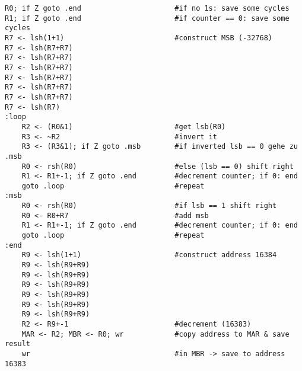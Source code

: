 \documentclass[a4paper, 12pt, margins=2cm]{homework}
\begin{document}
\newpage

  \begin{problem}
  \end{problem}
  \begin{solution} \hfill

    \begin{lstlisting}
R0; if Z goto .end                      #if no 1s: save some cycles
R1; if Z goto .end                      #if counter == 0: save some cycles
R7 <- lsh(1+1)                          #construct MSB (-32768)
R7 <- lsh(R7+R7)
R7 <- lsh(R7+R7)
R7 <- lsh(R7+R7)
R7 <- lsh(R7+R7)
R7 <- lsh(R7+R7)
R7 <- lsh(R7+R7)
R7 <- lsh(R7)
:loop
    R2 <- (R0&1)                        #get lsb(R0)
    R3 <- ~R2                           #invert it
    R3 <- (R3&1); if Z goto .msb        #if inverted lsb == 0 gehe zu .msb
    R0 <- rsh(R0)                       #else (lsb == 0) shift right 
    R1 <- R1+-1; if Z goto .end         #decrement counter; if 0: end
    goto .loop                          #repeat
:msb
    R0 <- rsh(R0)                       #if lsb == 1 shift right
    R0 <- R0+R7                         #add msb
    R1 <- R1+-1; if Z goto .end         #decrement counter; if 0: end
    goto .loop                          #repeat
:end
    R9 <- lsh(1+1)                      #construct address 16384
    R9 <- lsh(R9+R9)
    R9 <- lsh(R9+R9)
    R9 <- lsh(R9+R9)
    R9 <- lsh(R9+R9)
    R9 <- lsh(R9+R9)
    R9 <- lsh(R9+R9)
    R2 <- R9+-1                         #decrement (16383)
    MAR <- R2; MBR <- R0; wr            #copy address to MAR & save result
    wr                                  #in MBR -> save to address 16383\end{lstlisting}
  \end{solution}
\end{document}
